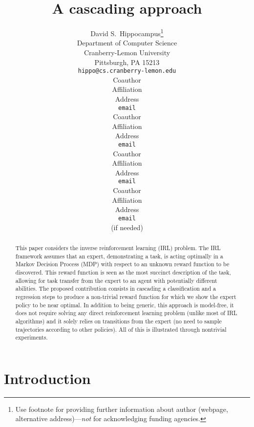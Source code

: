 \documentclass{article} %
\title{A cascading approach}
\author{
David S.~Hippocampus\thanks{ Use footnote for providing further information
about author (webpage, alternative address)---\emph{not} for acknowledging
funding agencies.} \\
Department of Computer Science\\
Cranberry-Lemon University\\
Pittsburgh, PA 15213 \\
\texttt{hippo@cs.cranberry-lemon.edu} \\
\And
Coauthor \\
Affiliation \\
Address \\
\texttt{email} \\
\AND
Coauthor \\
Affiliation \\
Address \\
\texttt{email} \\
\And
Coauthor \\
Affiliation \\
Address \\
\texttt{email} \\
\And
Coauthor \\
Affiliation \\
Address \\
\texttt{email} \\
(if needed)\\
}
\newcommand{\0}{\mathbf{0}}
\newcommand{\1}{\mathbf{1}}
\begin{document}
\maketitle              %
\begin{abstract}
This paper considers the inverse reinforcement learning (IRL) problem. The IRL framework assumes that an expert, demonstrating a task, is acting optimally in a Markov Decision Process (MDP) with respect to an unknown reward function to be discovered. This reward function is seen as the most succinct description of the task, allowing for task transfer from the expert to an agent with potentially different abilities. The proposed contribution consists in cascading a classification and a regression steps to produce a non-trivial reward function for which we show the expert policy to be near optimal. In addition to being generic, this approach is model-free, it does not require solving any direct reinforcement learning problem (unlike most of IRL algorithms) and it solely relies on transitions from the expert (no need to sample trajectories according to other policies). All of this is illustrated through nontrivial experiments.
\end{abstract}

\section{Introduction}
\end{document}
